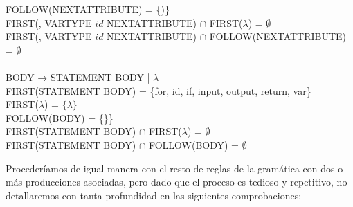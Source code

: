 \begin{tabbing}
    \> FOLLOW(NEXTATTRIBUTE) = \{)\}\\
    \> \> FIRST(, VARTYPE $id$ NEXTATTRIBUTE) $\cap$ FIRST($\lambda$) = $\emptyset$\\
    \> \> FIRST(, VARTYPE $id$ NEXTATTRIBUTE) $\cap$ FOLLOW(NEXTATTRIBUTE) = $\emptyset$\\
    \\
    BODY → STATEMENT BODY | $\lambda$\\
    \> FIRST(STATEMENT BODY) = \{for, id, if, input, output, return, var\}\\
    \> FIRST($\lambda$) = $\{\lambda\}$\\
    \> FOLLOW(BODY) = \{\}\}\\
    \> \> FIRST(STATEMENT BODY) $\cap$ FIRST($\lambda$) = $\emptyset$\\
    \> \> FIRST(STATEMENT BODY) $\cap$ FOLLOW(BODY) = $\emptyset$\\
\end{tabbing}
\newpage
Procederíamos de igual manera con el resto de reglas de la gramática con dos o más producciones asociadas, pero dado que el proceso es tedioso y repetitivo, no detallaremos con tanta profundidad en las siguientes comprobaciones:
